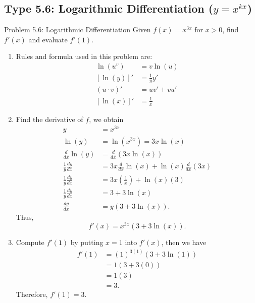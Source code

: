 \documentclass[11pt,a4paper]{article}
\begin{document}
\subsection{Type 5.6: Logarithmic Differentiation ($y = x^{kx}$)}
\begin{problembox}{Problem 5.6: Logarithmic Differentiation}
Given $f(x) = x^{3x}$ for $x > 0$, find $f'(x)$ and evaluate $f'(1)$.
\end{problembox}
\begin{solutionbox}
\begin{enumerate}
	\item [Step 1.] Rules and formula used in this problem are:
	\begin{align*}
		\ln(u^v) &= v \ln(u) \\
		[\ln(y)]' &= \frac{1}{y} y' \\
		(u \cdot v)' &= u v' + v u' \\
		[\ln(x)]' &= \frac{1}{x}
	\end{align*}
	
	\item [Step 2.] Find the derivative of $f$, we obtain
	\begin{align*}
		y &= x^{3x} \\
		\ln(y) &= \ln(x^{3x}) = 3x \ln(x) \\
		\frac{d}{dx} \ln(y) &= \frac{d}{dx} (3x \ln(x)) \\
		\frac{1}{y} \frac{dy}{dx} &= 3x \frac{d}{dx}\ln(x) + \ln(x) \frac{d}{dx}(3x) \\
		\frac{1}{y} \frac{dy}{dx} &= 3x \left(\frac{1}{x}\right) + \ln(x) (3) \\
		\frac{1}{y} \frac{dy}{dx} &= 3 + 3\ln(x) \\
		\frac{dy}{dx} &= y (3 + 3\ln(x)).
	\end{align*}
	Thus,
	\begin{equation*}
		f'(x) = x^{3x} (3 + 3\ln(x)).
	\end{equation*}
	
	\item [Step 3.] Compute $f'(1)$ by putting $x = 1$ into $f'(x)$, then we have
	\begin{align*}
		f'(1) &= (1)^{3(1)} (3 + 3\ln(1)) \\
		&= 1 (3 + 3(0)) \\
		&= 1(3) \\
		&= 3.
	\end{align*}
	Therefore, $f'(1) = 3$.
\end{enumerate}
\end{solutionbox}
\end{document}
